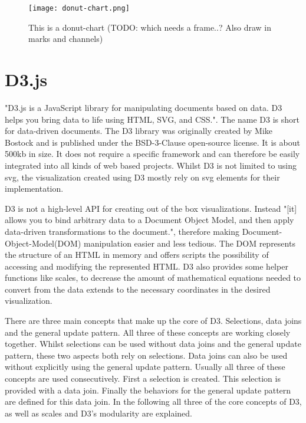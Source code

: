 \begin{figure}
    \texttt{[image: donut-chart.png]}
    \captionsetup{width=0.9\textwidth}
    \caption[donut-chart]{This is a donut-chart (TODO: which needs a frame..? Also draw in marks and channels)}
    \label{fig:donut-chart}
\end{figure}

\section{D3.js}

"D3.js is a JavaScript library for manipulating documents based on data. D3 helps you bring data to life using HTML, SVG, and CSS."\cite{d3js}. The name D3 is short for data-driven documents. The D3 library was originally created by Mike Bostock and is published under the BSD-3-Clause open-source license. It is about 500kb in size. It does not require a specific framework and can therefore be easily integrated into all kinds of web based projects. Whilst D3 is not limited to using svg, the visualization created using D3 mostly rely on svg elements for their implementation.

D3 is not a high-level API for creating out of the box visualizations. Instead "[it] allows you to bind arbitrary data to a Document Object Model, and then apply data-driven transformations to the document."\cite{d3js}, therefore making Document-Object-Model(DOM) manipulation easier and less tedious. The DOM represents the structure of an HTML in memory and offers scripts the possibility of accessing and modifying the represented HTML. D3 also provides some helper functions like scales, to decrease the amount of mathematical equations needed to convert from the data extends to the necessary coordinates in the desired visualization.

There are three main concepts that make up the core of D3. Selections, data joins and the general update pattern. All three of these concepts are working closely together. Whilst selections can be used without data joins and the general update pattern, these two aspects both rely on selections. Data joins can also be used without explicitly using the general update pattern. Usually all three of these concepts are used consecutively. First a selection is created. This selection is provided with a data join. Finally the behaviors for the general update pattern are defined for this data join.
In the following all three of the core concepts of D3, as well as scales and D3's modularity are explained.

